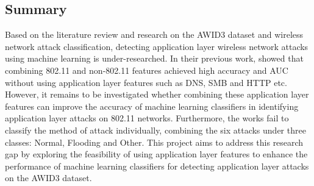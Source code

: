 \medskip


\subsection{Summary}

Based on the literature review and research on the AWID3 dataset and wireless network attack classification, detecting application layer wireless network attacks using machine learning is under-researched. In their previous work, \textcite{s22155633} showed that combining 802.11 and non-802.11 features achieved high accuracy and AUC without using application layer features such as DNS, SMB and HTTP etc. However, it remains to be investigated whether combining these application layer features can improve the accuracy of machine learning classifiers in identifying application layer attacks on 802.11 networks. Furthermore, the works fail to classify the method of attack individually, combining the six attacks under three classes: Normal, Flooding and Other. This project aims to address this research gap by exploring the feasibility of using application layer features to enhance the performance of machine learning classifiers for detecting application layer attacks on the AWID3 dataset.